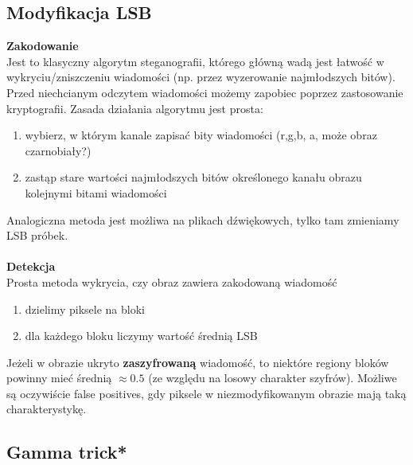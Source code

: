 \documentclass{article}
\begin{document}
\subsection{Modyfikacja LSB}
\textbf{Zakodowanie} \\
Jest to klasyczny algorytm steganografii, którego główną wadą jest łatwość w wykryciu/zniszczeniu wiadomości
(np. przez wyzerowanie najmłodszych bitów). Przed niechcianym odczytem wiadomości możemy zapobiec 
poprzez zastosowanie kryptografii. Zasada działania algorytmu jest prosta:
\begin{enumerate}
	\item wybierz, w którym kanale zapisać bity wiadomości (r,g,b, a, może obraz czarnobiały?)
	\item zastąp stare wartości najmłodszych bitów określonego kanału obrazu kolejnymi bitami wiadomości
\end{enumerate}
Analogiczna metoda jest możliwa na plikach dźwiękowych, tylko tam zmieniamy LSB próbek. \\\\
\textbf{Detekcja} \\
Prosta metoda wykrycia, czy obraz zawiera zakodowaną wiadomość
\begin{enumerate}
	\item dzielimy piksele na bloki
	\item dla każdego bloku liczymy wartość średnią LSB
\end{enumerate}
Jeżeli w obrazie ukryto \textbf{zaszyfrowaną} wiadomość, to niektóre regiony bloków
powinny mieć średnią $\approx 0.5$ (ze względu na losowy charakter szyfrów). Możliwe są
oczywiście false positives, gdy piksele w niezmodyfikowanym obrazie mają taką charakterystykę.

\subsection{Gamma trick*}
\end{document}
